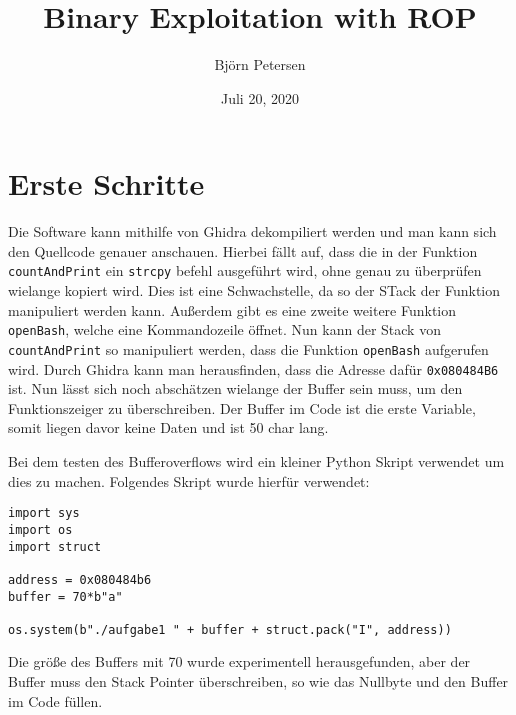 \documentclass[a4paper,12pt,
headsepline,           %
oneside,               %
pointlessnumbers,      %
bibtotoc,              %
BCOR15mm               %
]{scrbook}
\title{Binary Exploitation with ROP}
\date{Juli 20, 2020}
\author{Björn Petersen}
\begin{document}
\maketitle

\section*{Erste Schritte}
Die Software kann mithilfe von Ghidra dekompiliert werden und man kann sich den Quellcode genauer anschauen. Hierbei fällt auf, dass die in der Funktion \texttt{countAndPrint} ein \texttt{strcpy} befehl ausgeführt wird, ohne genau zu überprüfen wielange kopiert wird. Dies ist eine Schwachstelle, da so der STack der Funktion manipuliert werden kann. Außerdem gibt es eine zweite weitere Funktion \texttt{openBash}, welche eine Kommandozeile öffnet. Nun kann der Stack von \texttt{countAndPrint} so manipuliert werden, dass die Funktion \texttt{openBash} aufgerufen wird. Durch Ghidra kann man herausfinden, dass die Adresse dafür \texttt{0x080484B6} ist. 
Nun lässt sich noch abschätzen wielange der Buffer sein muss, um den Funktionszeiger zu überschreiben. Der Buffer im Code ist die erste Variable, somit liegen davor keine Daten und ist 50 char lang. 

Bei dem testen des Bufferoverflows wird ein kleiner Python Skript verwendet um dies zu machen. Folgendes Skript wurde hierfür verwendet:
\begin{lstlisting}
import sys
import os
import struct

address = 0x080484b6
buffer = 70*b"a"

os.system(b"./aufgabe1 " + buffer + struct.pack("I", address))
\end{lstlisting}

Die größe des Buffers mit 70 wurde experimentell herausgefunden, aber der Buffer muss den Stack Pointer überschreiben, so wie das Nullbyte und den Buffer im Code füllen.
\end{document}
